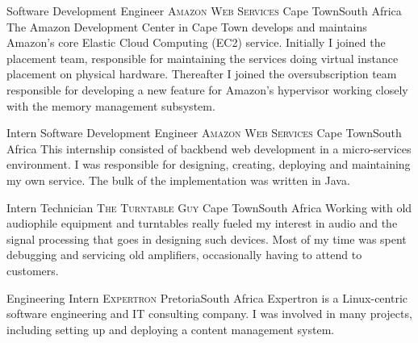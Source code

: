 \documentclass[10pt,a4paper,sans]{moderncv}
\begin{document}
{Software Development Engineer}
{\textsc{Amazon Web Services}}
{\newline Cape Town}{South Africa}
{The Amazon Development Center in Cape Town develops and maintains Amazon's
core Elastic Cloud Computing (EC2) service. Initially I joined the placement
team, responsible for maintaining the services doing virtual instance placement
on physical hardware. Thereafter I joined the oversubscription team responsible
for developing a new feature for Amazon's hypervisor working closely with the
memory management subsystem.}

{Intern Software Development Engineer}
{\textsc{Amazon Web Services}}
{\newline Cape Town}{South Africa}
{This internship consisted of backbend web development in a micro-services
environment. I was responsible for designing, creating, deploying and maintaining
my own service. The bulk of the implementation was written in Java.}

{Intern Technician}
{\textsc{The Turntable Guy}}
{\newline Cape Town}{South Africa}
{Working with old audiophile equipment and turntables really fueled my interest in
audio and the signal processing that goes in designing such devices. Most of my
time was spent debugging and servicing old amplifiers, occasionally having to
attend to customers.}

{Engineering Intern}
{\textsc{Expertron}}
{\newline Pretoria}{South Africa}
{Expertron is a Linux-centric software engineering and IT consulting company. I
was involved in many projects, including setting up and deploying a content
management system.}
\end{document}
